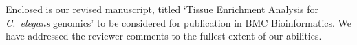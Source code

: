 \documentclass[12pt,stdletter,orderfromtodate,sigleft]{newlfm}
\begin{document}
\begin{newlfm}

 Enclosed is our revised manuscript, titled `Tissue Enrichment Analysis for \emph{C.~elegans} genomics' to be considered for publication in BMC Bioinformatics. We have addressed the reviewer comments to the fullest extent of our abilities. 


\end{newlfm}
\end{document}

